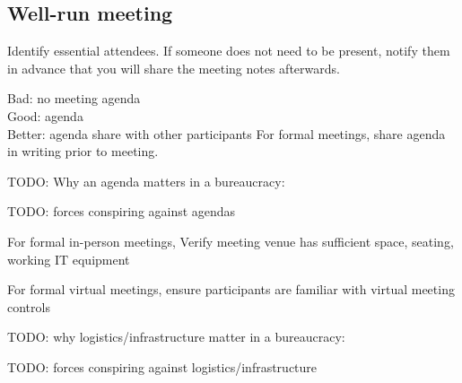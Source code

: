 \subsection{Well-run meeting\label{well-run_meeting}}

Identify essential attendees. If someone does not need to be present, notify them in advance that you will share the meeting notes afterwards. 


Bad: no meeting agenda\\
Good: agenda\\
Better: agenda share with other participants
For formal meetings, share agenda in writing prior to meeting. 

TODO: Why an agenda matters in a bureaucracy: 

TODO: forces conspiring against agendas


For formal in-person meetings, Verify meeting venue has sufficient space, seating, working IT equipment

For formal virtual meetings, ensure participants are familiar with virtual meeting controls

TODO: why logistics/infrastructure matter in a bureaucracy:

TODO: forces conspiring against logistics/infrastructure